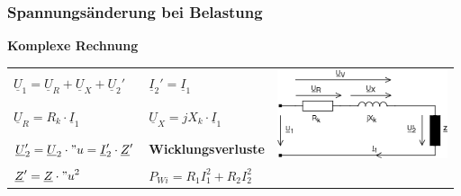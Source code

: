 		\subsubsection{Spannungs\"anderung bei Belastung}
		\textbf{Komplexe Rechnung}\\
			\begin{tabular}{p{5cm}p{5cm}p{6cm}}
	            		$\boxed{\underline{U}_1 =
	            		\underline{U}_R+\underline{U}_X+\underline{U}_2'}$ & 
	            		$\boxed{\underline{I}_2' = \underline{I}_1}$ &
	            		\multirow{3}{*}{
	            		\parbox{6cm}{\includegraphics[width=5cm]{bilder/ErsatzschaltbildTrafoLast.png}}}
	            			            	\\		
	            		$\underline{U}_R=R_k \cdot \underline{I}_1$ &
	            		$\underline{U}_X=jX_k \cdot \underline{I}_1$ \\
	            		$\underline{U}_2'=\underline{U}_2 \cdot "u = \underline{I}_2' \cdot \underline{Z}'  $ & \textbf{Wicklungsverluste} \\ 
	            		$\underline{Z}' = \underline{Z} \cdot {"u}^2$ & 
	            		$P_{Wi} = R_1 I_1^2 + R_2 I_2^2$ \\ 
            \end{tabular}\\
		\renewcommand{\arraystretch}{1.0}

